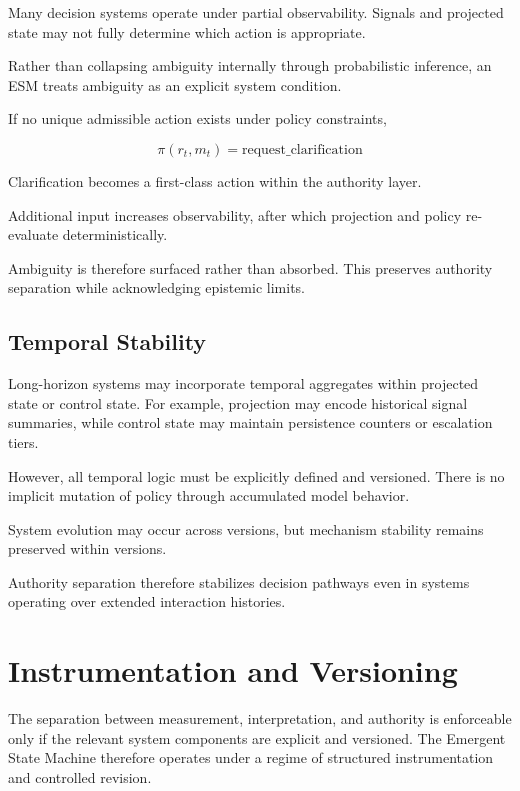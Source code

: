 \documentclass[11pt]{article}
\begin{document}
Many decision systems operate under partial observability. Signals and projected state may not fully determine which action is appropriate.

Rather than collapsing ambiguity internally through probabilistic inference, an ESM treats ambiguity as an explicit system condition.

If no unique admissible action exists under policy constraints,

\[
\pi(r_t, m_t) = \text{request\_clarification}
\]

Clarification becomes a first-class action within the authority layer.

Additional input increases observability, after which projection and policy re-evaluate deterministically.

Ambiguity is therefore surfaced rather than absorbed. This preserves authority separation while acknowledging epistemic limits.

\subsection{Temporal Stability}

Long-horizon systems may incorporate temporal aggregates within projected state or control state. For example, projection may encode historical signal summaries, while control state may maintain persistence counters or escalation tiers.

However, all temporal logic must be explicitly defined and versioned. There is no implicit mutation of policy through accumulated model behavior.

System evolution may occur across versions, but mechanism stability remains preserved within versions.

Authority separation therefore stabilizes decision pathways even in systems operating over extended interaction histories.


\section{Instrumentation and Versioning}

The separation between measurement, interpretation, and authority is enforceable only if the relevant system components are explicit and versioned. The Emergent State Machine therefore operates under a regime of structured instrumentation and controlled revision.
\end{document}
